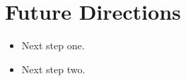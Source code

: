\section{Future Directions}
\label{sec:future-directions}


\begin{itemize}
  \item Next step one.
  \item Next step two.
\end{itemize}

